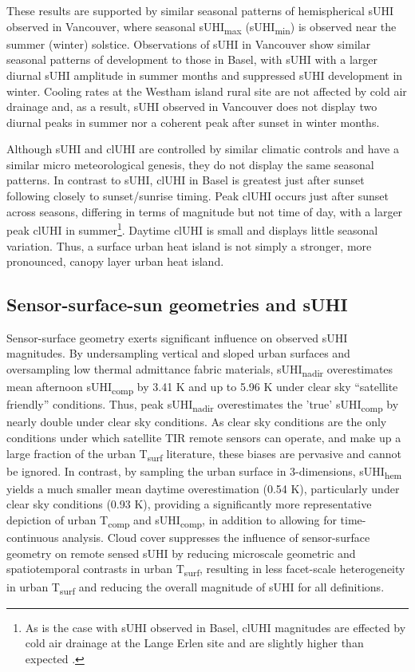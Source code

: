 \begin{bibunit}
These results are supported by similar seasonal patterns of hemispherical sUHI observed in Vancouver, where seasonal sUHI\textsubscript{max} (sUHI\textsubscript{min}) is observed near the summer (winter) solstice. Observations of sUHI in Vancouver show similar seasonal patterns of development to those in Basel, with sUHI with a larger diurnal sUHI amplitude in summer months and suppressed sUHI development in winter. Cooling rates at the Westham island rural site are not affected by cold air drainage and, as a result, sUHI observed in Vancouver does not display two diurnal peaks in summer nor a coherent peak after sunset in winter months. 

Although sUHI and clUHI are controlled by similar climatic controls and have a similar micro meteorological genesis, they do not display the same seasonal patterns. In contrast to sUHI, clUHI in Basel is greatest just after sunset following closely to sunset/sunrise timing. Peak clUHI occurs just after sunset across seasons, differing in terms of magnitude but not time of day, with a larger peak clUHI in summer\footnote{As is the case with sUHI observed in Basel, clUHI magnitudes are effected by cold air drainage at the Lange Erlen site and are slightly higher than expected \citep{Runnalls2000}.}. Daytime clUHI is small and displays little seasonal variation. Thus, a surface urban heat island is not simply a stronger, more pronounced, canopy layer urban heat island. 

\subsection{Sensor-surface-sun geometries and sUHI}

Sensor-surface geometry exerts significant influence on observed sUHI magnitudes. By undersampling vertical and sloped urban surfaces and oversampling low thermal admittance fabric materials, sUHI\textsubscript{nadir} overestimates mean afternoon sUHI\textsubscript{comp} by 3.41 \si{\kelvin} and up to 5.96 \si{\kelvin} under clear sky “satellite friendly” conditions. Thus, peak sUHI\textsubscript{nadir} overestimates the 'true' sUHI\textsubscript{comp} by nearly double under clear sky conditions. As clear sky conditions are the only conditions under which satellite TIR remote sensors can operate, and make up a large fraction of the urban T\textsubscript{surf} literature, these biases are pervasive and cannot be ignored. In contrast, by sampling the urban surface in 3-dimensions, sUHI\textsubscript{hem} yields a much smaller mean daytime overestimation (0.54 \si{\kelvin}), particularly under clear sky conditions (0.93 \si{\kelvin}), providing a significantly more representative depiction of urban T\textsubscript{comp} and sUHI\textsubscript{comp}, in addition to allowing for time-continuous analysis. Cloud cover suppresses the influence of sensor-surface geometry on remote sensed sUHI by reducing microscale geometric and spatiotemporal contrasts in urban T\textsubscript{surf}, resulting in less facet-scale heterogeneity in urban T\textsubscript{surf} and reducing the overall magnitude of sUHI for all definitions.


\end{bibunit}

